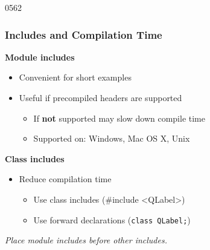 \begin{slide}[fragile]{0562}\frametitle{Includes and Compilation Time} 
  \textbf{Module includes}
  \begin{itemize}
  \begin{cpp}
#include <QtGui>
  \end{cpp}
\item Convenient for short examples  
\item Useful if precompiled headers are supported
  \begin{itemize}
  \item If \textbf{not} supported may slow down compile time
  \item Supported on: Windows, Mac OS X, Unix \\
  \end{itemize}
 \end{itemize}
\textbf{Class includes}
\begin{itemize}
 \begin{cpp}
#include <QLabel>
  \end{cpp}
   \item Reduce compilation time
     \begin{itemize}
     \item Use class includes (\#include <QLabel>)
     \item Use forward declarations (\texttt{class QLabel;})
     \end{itemize}
   \end{itemize}
   \vspace{3mm}
   \textit{Place module includes before other includes.}
\end{slide}
